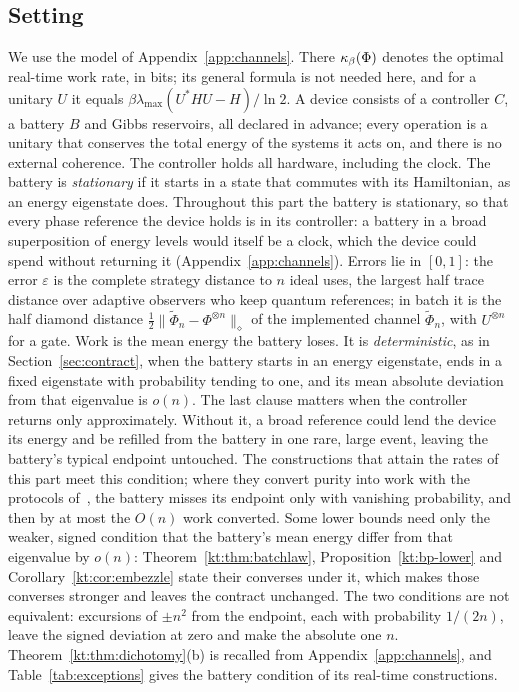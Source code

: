 \subsection{Setting}\label{kt:sec:setting}

We use the model of Appendix~\ref{app:channels}. There $\kappa_\beta(\Phi)$ denotes the optimal real-time work rate, in bits; its general formula is not needed here, and for a unitary $U$ it equals $\beta\lambda_{\max}(U^*HU-H)/\ln2$. A device consists of a controller $C$, a battery $B$ and Gibbs reservoirs, all declared in advance; every operation is a unitary that conserves the total energy of the systems it acts on, and there is no external coherence. The controller holds all hardware, including the clock. The battery is \emph{stationary} if it starts in a state that commutes with its Hamiltonian, as an energy eigenstate does. Throughout this part the battery is stationary, so that every phase reference the device holds is in its controller: a battery in a broad superposition of energy levels would itself be a clock, which the device could spend without returning it (Appendix~\ref{app:channels}). Errors lie in $[0,1]$: the error $\varepsilon$ is the complete strategy distance to $n$ ideal uses, the largest half trace distance over adaptive observers who keep quantum references; in batch it is the half diamond distance $\tfrac12\|\widetilde\Phi_n-\Phi^{\otimes n}\|_\diamond$ of the implemented channel $\widetilde\Phi_n$, with $U^{\otimes n}$ for a gate. Work is the mean energy the battery loses. It is \emph{deterministic}, as in Section~\ref{sec:contract}, when the battery starts in an energy eigenstate, ends in a fixed eigenstate with probability tending to one, and its mean absolute deviation from that eigenvalue is $o(n)$. The last clause matters when the controller returns only approximately. Without it, a broad reference could lend the device its energy and be refilled from the battery in one rare, large event, leaving the battery's typical endpoint untouched. The constructions that attain the rates of this part meet this condition; where they convert purity into work with the protocols of~\cite{HorodeckiOppenheim13}, the battery misses its endpoint only with vanishing probability, and then by at most the $O(n)$ work converted. Some lower bounds need only the weaker, signed condition that the battery's mean energy differ from that eigenvalue by $o(n)$: Theorem~\ref{kt:thm:batchlaw}, Proposition~\ref{kt:bp-lower} and Corollary~\ref{kt:cor:embezzle} state their converses under it, which makes those converses stronger and leaves the contract unchanged. The two conditions are not equivalent: excursions of $\pm n^2$ from the endpoint, each with probability $1/(2n)$, leave the signed deviation at zero and make the absolute one $n$. Theorem~\ref{kt:thm:dichotomy}(b) is recalled from Appendix~\ref{app:channels}, and Table~\ref{tab:exceptions} gives the battery condition of its real-time constructions.

